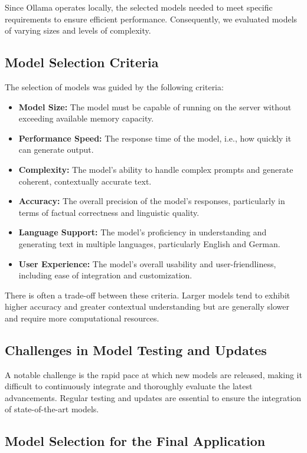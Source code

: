 Since Ollama operates locally, the selected models needed to meet specific requirements to ensure efficient performance. 
Consequently, we evaluated models of varying sizes and levels of complexity.

\subsection{Model Selection Criteria}

The selection of models was guided by the following criteria:

\begin{itemize}
\item \textbf{Model Size:} The model must be capable of running on the server without exceeding available memory capacity.
\item \textbf{Performance Speed:} The response time of the model, i.e., how quickly it can generate output.
\item \textbf{Complexity:} The model's ability to handle complex prompts and generate coherent, contextually accurate text.
\item \textbf{Accuracy:} The overall precision of the model's responses, particularly in terms of factual correctness and linguistic quality.
\item \textbf{Language Support:} The model's proficiency in understanding and generating text in multiple languages, particularly English and German.
\item \textbf{User Experience:} The model's overall usability and user-friendliness, including ease of integration and customization.
\end{itemize}

There is often a trade-off between these criteria. 
Larger models tend to exhibit higher accuracy and greater contextual understanding but are generally slower and 
require more computational resources.

\subsection{Challenges in Model Testing and Updates}

A notable challenge is the rapid pace at which new models are released, 
making it difficult to continuously integrate and thoroughly evaluate the latest advancements. 
Regular testing and updates are essential to ensure the integration of state-of-the-art models.

\subsection{Model Selection for the Final Application}

